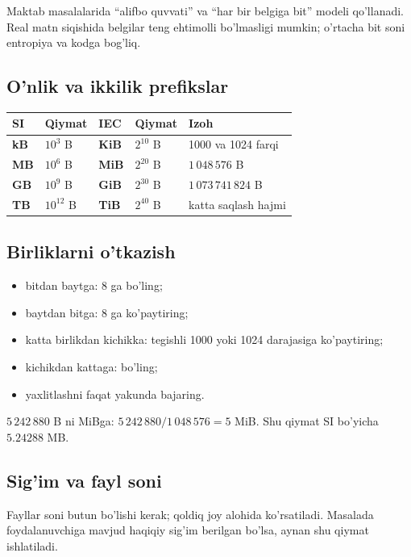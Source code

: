 \documentclass[11pt,a4paper,oneside]{book}
\newcommand{\formula}[1]{\begin{center}\tcboxmath[colback=GoldLight,colframe=Gold,boxrule=.7pt,arc=2mm]{#1}\end{center}}
\begin{document}
\begin{clarify}
Maktab masalalarida ``alifbo quvvati'' va ``har bir belgiga bit'' modeli qo'llanadi. Real matn siqishida belgilar teng ehtimolli bo'lmasligi mumkin; o'rtacha bit soni entropiya va kodga bog'liq.
\end{clarify}

\subsection{O'nlik va ikkilik prefikslar}
\begin{longtable}{>{\ttfamily\bfseries}p{18mm}p{26mm}>{\ttfamily\bfseries}p{18mm}p{31mm}p{48mm}}
\toprule
SI & Qiymat & IEC & Qiymat & Izoh\\
\midrule
kB & $10^3$ B & KiB & $2^{10}$ B & 1000 va 1024 farqi\\
MB & $10^6$ B & MiB & $2^{20}$ B & $1\,048\,576$ B\\
GB & $10^9$ B & GiB & $2^{30}$ B & $1\,073\,741\,824$ B\\
TB & $10^{12}$ B & TiB & $2^{40}$ B & katta saqlash hajmi\\
\bottomrule
\end{longtable}

\subsection{Birliklarni o'tkazish}
\begin{itemize}
\item bitdan baytga: 8 ga bo'ling;
\item baytdan bitga: 8 ga ko'paytiring;
\item katta birlikdan kichikka: tegishli 1000 yoki 1024 darajasiga ko'paytiring;
\item kichikdan kattaga: bo'ling;
\item yaxlitlashni faqat yakunda bajaring.
\end{itemize}

\begin{examplebox}
$5\,242\,880$ B ni MiBga: $5\,242\,880/1\,048\,576=5$ MiB. Shu qiymat SI bo'yicha $5.24288$ MB.
\end{examplebox}

\subsection{Sig'im va fayl soni}
\formula{n=\left\lfloor\frac{S_{\text{bo'sh}}}{S_{\text{bitta fayl}}}\right\rfloor}
Fayllar soni butun bo'lishi kerak; qoldiq joy alohida ko'rsatiladi. Masalada foydalanuvchiga mavjud haqiqiy sig'im berilgan bo'lsa, aynan shu qiymat ishlatiladi.
\end{document}
